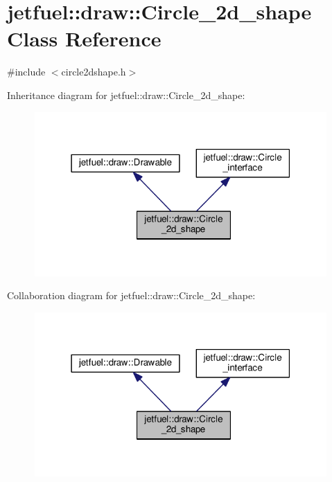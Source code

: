 \hypertarget{classjetfuel_1_1draw_1_1Circle__2d__shape}{}\section{jetfuel\+:\+:draw\+:\+:Circle\+\_\+2d\+\_\+shape Class Reference}
\label{classjetfuel_1_1draw_1_1Circle__2d__shape}


{\ttfamily \#include $<$circle2dshape.\+h$>$}



Inheritance diagram for jetfuel\+:\+:draw\+:\+:Circle\+\_\+2d\+\_\+shape\+:\nopagebreak
\begin{figure}[H]
\begin{center}
\leavevmode
\includegraphics[width=316pt]{classjetfuel_1_1draw_1_1Circle__2d__shape__inherit__graph}
\end{center}
\end{figure}


Collaboration diagram for jetfuel\+:\+:draw\+:\+:Circle\+\_\+2d\+\_\+shape\+:\nopagebreak
\begin{figure}[H]
\begin{center}
\leavevmode
\includegraphics[width=316pt]{classjetfuel_1_1draw_1_1Circle__2d__shape__coll__graph}
\end{center}
\end{figure}
